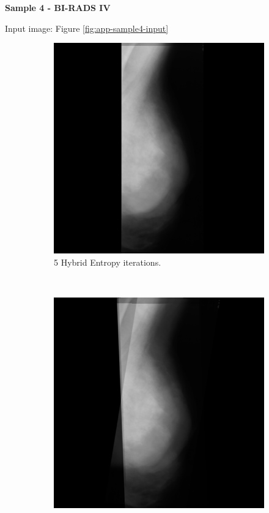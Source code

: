 \newpage \noindent \textbf{Sample 4 - BI-RADS IV}

Input image: Figure \ref{fig:app-sample4-input}

\begin{figure}[H]
    \centering
    \begin{subfigure}[t]{0.3\textwidth}
        \includegraphics[width=\textwidth]{Appendix5/sample4/hybrid/hybrid_5.png}
        \caption{5 Hybrid Entropy iterations.}
        \label{fig:app-5-hybrid-sample4}
    \end{subfigure} \hfill
    ~ %
    \begin{subfigure}[t]{0.3\textwidth}
        \includegraphics[width=\textwidth]{Appendix5/sample4/hybrid/hybrid_10.png}

\end{subfigure}
\end{figure}
